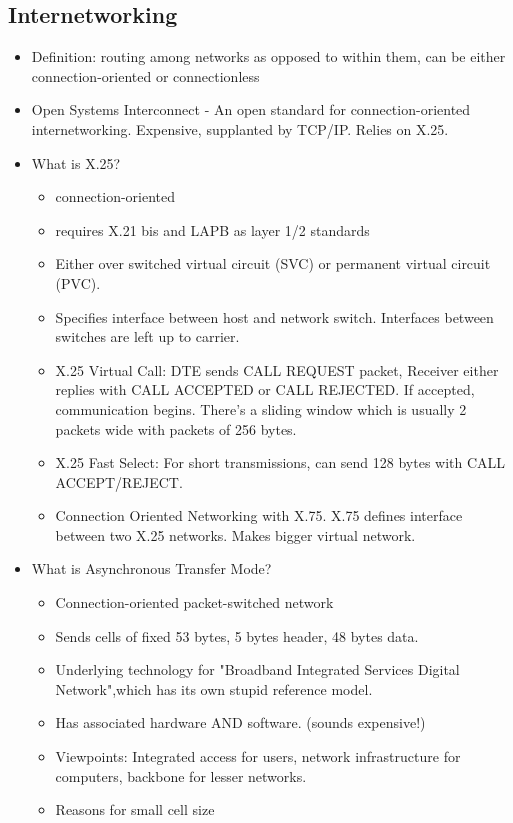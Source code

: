 \documentclass{scrartcl}
\begin{document}
\subsection*{Internetworking}
\begin{itemize}
\item Definition: routing among networks as opposed to within them, can be
either connection-oriented or connectionless
\item Open Systems Interconnect - An open standard for connection-oriented
internetworking. Expensive, supplanted by TCP/IP. Relies on X.25.
\item What is X.25?
\begin{itemize}
\item connection-oriented
\item requires X.21 bis and LAPB as layer 1/2 standards
\item Either over switched virtual circuit (SVC) or permanent virtual circuit
(PVC).
\item Specifies interface between host and network switch. Interfaces between
switches are left up to carrier.
\item X.25 Virtual Call: DTE sends CALL REQUEST packet, Receiver either replies
 with CALL ACCEPTED or CALL REJECTED. If accepted, communication begins.
 There's a sliding window which is usually 2 packets wide with packets of 256
 bytes.
\item X.25 Fast Select: For short transmissions, can send 128 bytes with CALL
 ACCEPT/REJECT.
\item Connection Oriented Networking with X.75. X.75 defines interface between
 two X.25 networks. Makes bigger virtual network.
\end{itemize}
\item What is Asynchronous Transfer Mode?
\begin{itemize}
\item Connection-oriented packet-switched network
\item Sends cells of fixed 53 bytes, 5 bytes header, 48 bytes data.
\item Underlying technology for "Broadband Integrated Services Digital Network",which has its own stupid reference model.
\item Has associated hardware AND software. (sounds expensive!)
\item Viewpoints: Integrated access for users, network infrastructure for
 computers, backbone for lesser networks.
\item Reasons for small cell size

\end{itemize}
\end{itemize}
\end{document}
